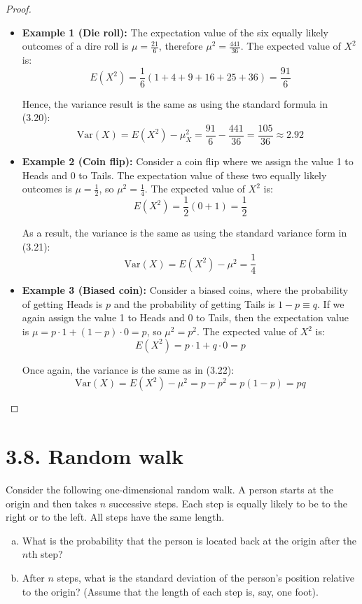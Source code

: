 \begin{proof}
    \hfill
    \begin{itemize}
        \item \textbf{Example 1 (Die roll):} The expectation value of the six equally likely outcomes
            of a dire roll is $\mu = \frac{21}{6}$, therefore $\mu^2 = \frac{441}{36}$. The expected value
            of $X^2$ is:
            \[
                E(X^2) = \frac{1}{6}(1 + 4 + 9 + 16 + 25 + 36) = \frac{91}{6}
            \] 

            Hence, the variance result is the same as using the standard formula in (3.20): 
            \[
                \text{Var}(X) = E(X^2) - \mu_X^2 = \frac{91}{6} - \frac{441}{36} = \frac{105}{36} \approx 2.92
            \] 

        \item \textbf{Example 2 (Coin flip):} Consider a coin flip where we assign the value 1 to Heads
            and 0 to Tails. The expectation value of these two equally likely outcomes is $\mu = \frac{1}{2}$,
            so $\mu^2 = \frac{1}{4}$. The expected value of $X^2$ is:
            \[
                E(X^2) = \frac{1}{2} (0 + 1) = \frac{1}{2}
            \] 

            As a result, the variance is the same as using the standard variance form in (3.21):
            \[
                \text{Var}(X) = E(X^2) - \mu^2 = \frac{1}{4}
            \] 

        \item \textbf{Example 3 (Biased coin):} Consider a biased coins, where the probability of getting
            Heads is $p$ and the probability of getting Tails is $1 - p \equiv q$. If we again
            assign the value 1 to Heads and 0 to Tails, then the expectation value is 
            $\mu = p \cdot 1 + (1 - p) \cdot 0 = p$, so $\mu^2 = p^2$. The expected value
            of $X^2$ is:
             \[
                 E(X^2) = p \cdot 1 + q \cdot 0 = p
            \] 

            Once again, the variance is the same as in (3.22):
            \[
                \text{Var}(X) = E(X^2) - \mu^2 = p - p^2 = p(1 - p) = pq
            \] 
    \end{itemize}
\end{proof}

\section*{3.8. Random walk}
Consider the following one-dimensional random walk. A person starts at the origin and
then takes $n$ successive steps. Each step is equally likely to be to the right or to the
left. All steps have the same length.
\begin{enumerate}[(a)]
    \item What is the probability that the person is located back at the 
        origin after the $n$th step?

    \item After $n$ steps, what is the standard deviation of the person's position
        relative to the origin? (Assume that the length of each step is, say, one 
        foot).
\end{enumerate}

